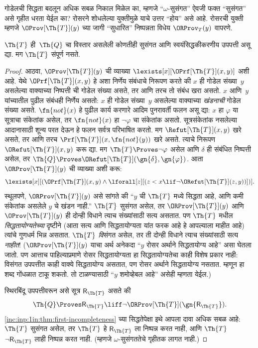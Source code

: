 गोडेलची सिद्धता बदलून अधिक सबळ निकाल मिळेल का,
म्हणजे “$\omega$-सुसंगत” ऐवजी फक्त
“सुसंगत” असे गृहीत धरता येईल का?
रोसरने शोधलेल्या युक्तीमुळे याचे उत्तर
“होय” असे आहे. रोसरची युक्ती म्हणजे
$\OProv[\Th{T}](y)$ च्या जागी
“सुधारित” निष्पन्नता विधेय
$\ORProv_T(y)$ वापरणे.

\begin{thm}
\label{inc:inp:ros:thm:rosser}
$\Th{T}$ ही~$\Th{Q}$ चा विस्तार
असलेली कोणतीही सुसंगत आणि
स्वयंसिद्धकीकरणीय उपपत्ती असू द्या.
मग $\Th{T}$ संपूर्ण नसते.
\end{thm}

\begin{proof}
आठवा, $\OProv[\Th{T}](y)$ ची व्याख्या
$\lexists[x][\OPrf[\Th{T}](x,
  y)]$ अशी आहे. येथे
$\OPrf[\Th{T}](x, y)$ हे अशा निर्णेय
संबंधाचे निरूपण करते की $x$ ही
गोडेल संख्या~$y$ असलेल्या
वाक्याच्या निष्पत्ती
ची गोडेल संख्या असते, तर आणि तरच तो
संबंध खरा असतो. $x$ आणि~$y$
यांच्यातील पुढील संबंधही निर्णेय
असतो: $x$ ही गोडेल
संख्या~$y$ असलेल्या वाक्याच्या
\emph{खंडनाची} गोडेल संख्या असते.
$\fn{not}(x)$ हे पुढील कार्य
करणारे आदिम पुनरावर्ती फलन
असू द्या: $x$ हा $\varphi$ या
सूत्राचा संकेतांक असेल, तर
$\fn{not}(x)$ हा $\lnot
\varphi$ चा संकेतांक असतो. सूत्रसंकेतांक नसलेल्या
आदानासाठी शून्य परत देऊन हे फलन सर्वत्र परिभाषित करतो. मग
$\Refut[\Th{T}](x, y)$
खरे असते, तर आणि तरच
$\Prf[\Th{T}](x, \fn{not}(y))$
खरे असते. त्याचे निरूपण
$\ORefut[\Th{T}](x, y)$
करू द्या. मग
$\Th{T} \Proves \lnot \varphi$
असेल आणि $\delta$ ही
संबंधित निष्पत्ती असेल,
तर $\Th{Q} \Proves
\ORefut[\Th{T}](\gn{\delta}, \gn{\varphi})$.
आता $\ORProv[\Th{T}](y)$ ची
व्याख्या अशी करू:
\[\lexists[x][(\OPrf[\Th{T}](x,y) \land \lforall[z][(z < x \lif \lnot
  \ORefut[\Th{T}](z,y))])].
\]
स्थूलपणे, $\ORProv[\Th{T}](y)$
असे सांगते की “$y$ ची
$\Th{T}$ मध्ये सिद्धता आहे,
आणि कमी संकेतांक असलेले
$y$ चे खंडन नाही.”
$\Th{T}$ सुसंगत असेल,
तर $\ORProv[\Th{T}](y)$ आणि
$\OProv[\Th{T}](y)$ ही दोन्ही
विधाने त्याच संख्यांसाठी
सत्य असतात. पण $\Th{T}$
मधील \emph{सिद्धतायोग्यतेच्या}
दृष्टीने (आता सत्य आणि
सिद्धतायोग्यता यांत फरक आहे
हे आपल्याला माहीत आहे)
त्यांचे गुणधर्म भिन्न असतात.
$\Th{T}$ \emph{वि}संगत
असेल, तर ती दोन्ही विधाने
त्याच संख्यांसाठी सत्य
\emph{नाहीत}!{}
($\ORProv[\Th{T}](y)$
याचा अर्थ अनेकदा “$y$ रोसर
अर्थाने सिद्धतायोग्य आहे”
असा घेतला जातो. पण आत्ताच
पाहिल्याप्रमाणे रोसर
सिद्धतायोग्यता हा
सिद्धतायोग्यतेचा काही
विशेष प्रकार नाही:
विसंगत उपपत्तीत काही
वाक्ये सिद्धतायोग्य
असतात, पण रोसर अर्थाने
सिद्धतायोग्य नसतात.
म्हणून हा शब्द गोंधळात
टाकू शकतो. तो टाळण्यासाठी
“$y$ शमोव्हेबल आहे”
असेही म्हणता येईल.)

स्थिरबिंदू उपपत्तीवरून
असे सूत्र $\mathsf{R}_\Th{T}$
असते की
\begin{equation}
  \Th{Q} \Proves \mathsf{R}_\Th{T} \liff \lnot \ORProv[\Th{T}](\gn{\mathsf{R}_\Th{T}}).
  \label{inc:inp:ros:RT}
\end{equation}
\ref{inc:inp:1in:thm:first-incompleteness}
च्या सिद्धतेपेक्षा इथे
आपला दावा अधिक सबळ आहे:
$\Th{T}$ सुसंगत असेल,
तर $\Th{T}$ हे
$\mathsf{R}_\Th{T}$ ला निष्पन्न
करत नाही, आणि $\Th{T}$
$\lnot \mathsf{R}_\Th{T}$ लाही
निष्पन्न करत नाही.
(म्हणजे $\omega$-सुसंगततेचे
गृहीतक लागत नाही.)


\end{proof}
